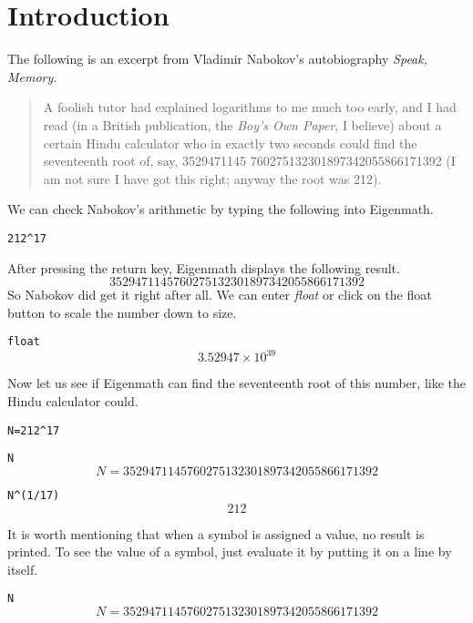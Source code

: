 \section{Introduction}
The following is an excerpt from Vladimir Nabokov's
autobiography {\it Speak, Memory.}
\begin{quote}
A foolish tutor had explained logarithms to me much too early, and I had
read (in a British publication, the {\it Boy's Own Paper}, I believe)
about a certain Hindu calculator who in exactly two seconds could find the
seventeenth root of, say,
3529471145 760275132301897342055866171392
(I am not sure I have got this right; anyway the root was 212).
\end{quote}
We can check Nabokov's arithmetic by typing the following into Eigenmath.

\medskip
\verb$212^17$

\medskip
\noindent
After pressing the return key, Eigenmath displays the following result.
$$3529471145760275132301897342055866171392$$
So Nabokov did get it right after all.
We can enter {\it float} or click on the float button to scale the number
down to size.

\medskip
\verb$float$
$$3.52947\times10^{39}$$

\medskip
\noindent
Now let us see if Eigenmath can find the
seventeenth root of this number, like the Hindu calculator could.

\medskip
\verb$N=212^17$

\verb$N$
$$N=3529471145760275132301897342055866171392$$

\verb$N^(1/17)$
$$212$$

\medskip
\noindent
It is worth mentioning that when a symbol is assigned a value,
no result is printed.
To see the value of a symbol, just evaluate it by putting it on a line by
itself.

\medskip
\verb$N$
$$N=3529471145760275132301897342055866171392$$

